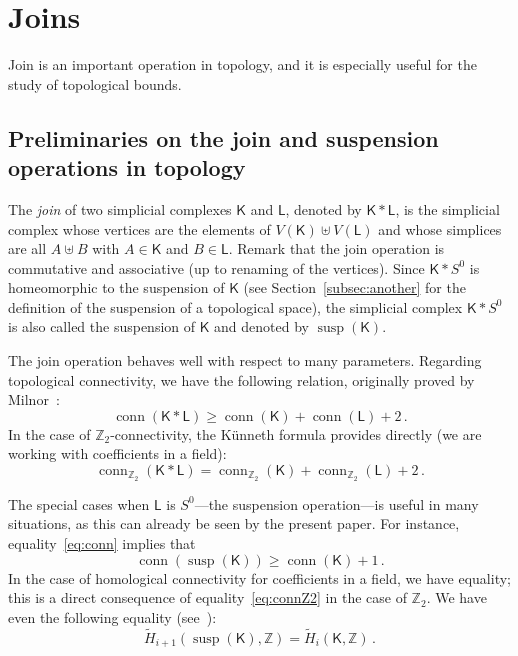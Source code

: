 \documentclass[12pt]{amsart}
\theoremstyle{definition}
\def\Z{\mathbb{Z}}
\def\K{\mathsf{K}}
\def\L{\mathsf{L}}
\renewcommand{\geq}{\geqslant}
\def\susp{\operatorname{susp}}
\def\conn{\operatorname{conn}}
\begin{document}
\section{Joins}\label{sec:join}

Join is an important operation in topology, and it is especially useful for the study of topological bounds. %

\subsection{Preliminaries on the join and suspension operations in topology}

The {\em join} of two simplicial complexes $\K$ and $\L$, denoted by $\K * \L$, is the simplicial complex whose vertices are the elements of $V(\K) \uplus V(\L)$ and whose simplices are all $A \uplus B$ with $A \in \K$ and $B \in \L$. Remark that the join operation is commutative and associative (up to renaming of the vertices). Since $\K * S^0$ is homeomorphic to the suspension of $\K$ (see Section~\ref{subsec:another} for the definition of the suspension of a topological space), the simplicial complex $\K * S^0$ is also called the suspension of $\K$ and denoted by $\susp(\K)$.

The join operation behaves well with respect to many parameters.
Regarding topological connectivity, we have the following relation, originally proved by Milnor~\cite{milnor1956construction}:
\begin{equation}\label{eq:conn}
\conn(\K * \L) \geq \conn(\K) + \conn(\L) +2 \, .
\end{equation}
In the case of $\Z_2$-connectivity, the K\"unneth formula provides directly (we are working with coefficients in a field):
\begin{equation}\label{eq:connZ2}
\conn_{\Z_2}(\K * \L) = \conn_{\Z_2}(\K) + \conn_{\Z_2}(\L) +2 \, .
\end{equation}

The special cases when $\L$ is $S^0$---the suspension operation---is useful in many situations, as this can already be seen by the present paper. For instance, equality~\eqref{eq:conn} implies that
\begin{equation}\label{eq:conn-susp}
\conn(\susp(\K)) \geq \conn(\K) + 1\, .
\end{equation}
In the case of homological connectivity for coefficients in a field, we have equality; this is a direct consequence of equality~\eqref{eq:connZ2} in the case of $\Z_2$. We have even the following equality (see~\cite[Exercise 32]{hatcher2005algebraic}):
\begin{equation}\label{eq:homo-susp}
\widetilde{H}_{i+1}(\susp(\K),\Z) = \widetilde{H}_i(\K,\Z) \, .
\end{equation}
\end{document}
